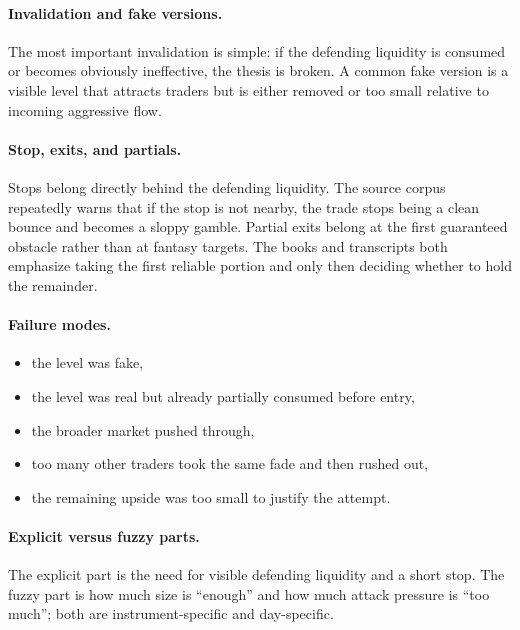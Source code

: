 \paragraph{Invalidation and fake versions.} The most important invalidation is simple: if the defending liquidity is consumed or becomes obviously ineffective, the thesis is broken. A common fake version is a visible level that attracts traders but is either removed or too small relative to incoming aggressive flow.

\paragraph{Stop, exits, and partials.} Stops belong directly behind the defending liquidity. The source corpus repeatedly warns that if the stop is not nearby, the trade stops being a clean bounce and becomes a sloppy gamble. Partial exits belong at the first guaranteed obstacle rather than at fantasy targets. The books and transcripts both emphasize taking the first reliable portion and only then deciding whether to hold the remainder.

\paragraph{Failure modes.}
\begin{itemize}
\item the level was fake,
\item the level was real but already partially consumed before entry,
\item the broader market pushed through,
\item too many other traders took the same fade and then rushed out,
\item the remaining upside was too small to justify the attempt.
\end{itemize}

\paragraph{Explicit versus fuzzy parts.} The explicit part is the need for visible defending liquidity and a short stop. The fuzzy part is how much size is ``enough'' and how much attack pressure is ``too much''; both are instrument-specific and day-specific.


